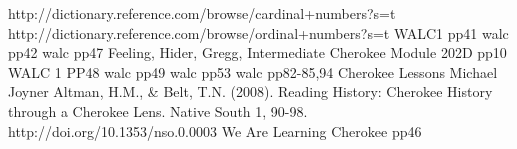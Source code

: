 

\begin{thebibliography}{99}
 http://dictionary.reference.com/browse/cardinal+numbers?s=t
 http://dictionary.reference.com/browse/ordinal+numbers?s=t
 WALC1 pp41
 walc pp42
 walc pp47
 Feeling, Hider, Gregg, Intermediate Cherokee Module 202D pp10
 WALC 1 PP48
 walc pp49
 walc pp53
 walc pp82-85,94
 Cherokee Lessons Michael Joyner
 Altman, H.M., \& Belt, T.N. (2008). Reading History: Cherokee History through a Cherokee Lens. Native South 1, 90-98. http://doi.org/10.1353/nso.0.0003
 We Are Learning Cherokee pp46
\end{thebibliography}
